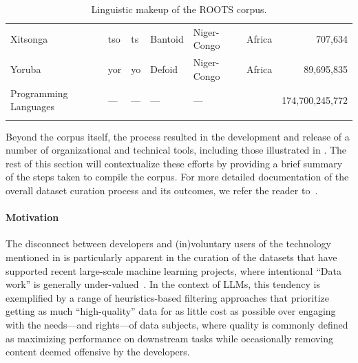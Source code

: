 \documentclass[twoside,11pt]{article}
\begin{document}
\begin{table}[]
{\begin{tabular}{lTTlllr}
Xitsonga            & tso       & ts          & Bantoid                 & Niger-Congo    & Africa    & 707,634        \\
Yoruba              & yor       & yo          & Defoid                  & Niger-Congo    & Africa    & 89,695,835      \\
Programming Languages                & ---      & ---        & ---                    & ---           &       & 174,700,245,772 \\
\bottomrule \\
\end{tabular}
}
\caption{Linguistic makeup of the ROOTS corpus.}
\label{tab:language_families}
\end{table}
Beyond the corpus itself, the process resulted in the development and release of a number of organizational and technical tools, including those illustrated in .
The rest of this section will contextualize these efforts by providing a brief summary of the steps taken to compile the corpus. For more detailed documentation of the overall dataset curation process and its outcomes, we refer the reader to~\citet{laurencon2022bigscience}.

\paragraph{Motivation} The disconnect between developers and (in)voluntary users of the technology mentioned in  is particularly apparent in the curation of the datasets that have supported recent large-scale machine learning projects, where intentional ``Data work'' is generally under-valued~\citep{sambasivan2021cascades}. In the context of LLMs, this tendency is exemplified by a range of heuristics-based filtering approaches that prioritize getting as much ``high-quality'' data for as little cost as possible over engaging with the needs---and rights---of data subjects, where quality is commonly defined as maximizing performance on downstream tasks while occasionally removing content deemed offensive by the developers.
\end{document}
